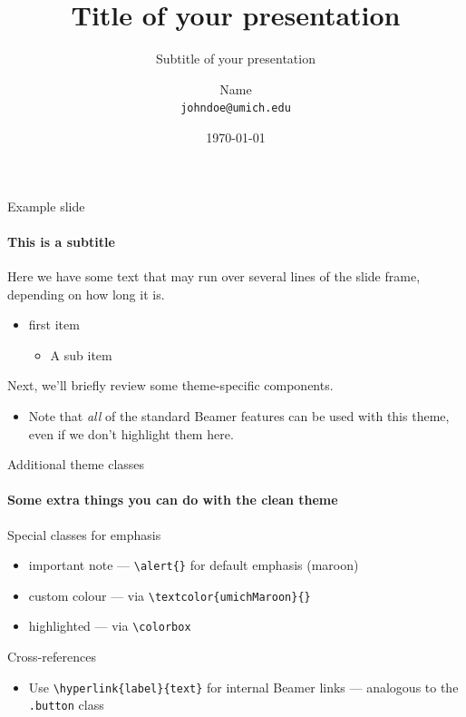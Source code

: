 \documentclass[aspectratio=169, 12pt]{beamer}
\title{Title of your presentation}
\subtitle{Subtitle of your presentation}
\author[Name]{%
  Name \orcid{0000-0000-0000-0000} \\  %
  \texttt{\footnotesize johndoe@umich.edu}}
\institute[University of Michigan]{%
Department of political science, University of Michigan}
\date{\today}
\begin{document}
\begin{frame}[plain]
	\titlepage
\end{frame}

\begin{frame}{Example slide}
	\framesubtitle{This is a subtitle}

	Here we have some text that may run over several lines of the slide frame,
	depending on how long it is.

	\begin{itemize}
		\item first item
		      \begin{itemize}
			      \item A sub item
		      \end{itemize}
	\end{itemize}

	\medskip
	Next, we'll briefly review some theme-specific components.

	\begin{itemize}
		\item Note that \textit{all} of the standard Beamer features can be used
		      with this theme, even if we don't highlight them here.
	\end{itemize}
\end{frame}

\begin{frame}{Additional theme classes}
	\framesubtitle{Some extra things you can do with the clean theme}

	Special classes for emphasis

	\begin{itemize}
		\item \alert{important note} — \texttt{\textbackslash alert\{\}} for
		      default emphasis (maroon)
		\item \textcolor{umichMaroon}{custom colour} — via
		      \texttt{\textbackslash textcolor\{umichMaroon\}\{\}}
		\item \colorbox{umichMaroon!20}{\textcolor{umichMaroon}{highlighted}} — via
		      \texttt{\textbackslash colorbox}
	\end{itemize}

	\medskip
	Cross-references

	\begin{itemize}
		\item Use \texttt{\textbackslash hyperlink\{label\}\{text\}} for internal
		      Beamer links — analogous to the \texttt{.button} class
	\end{itemize}
\end{frame}

\end{document}
